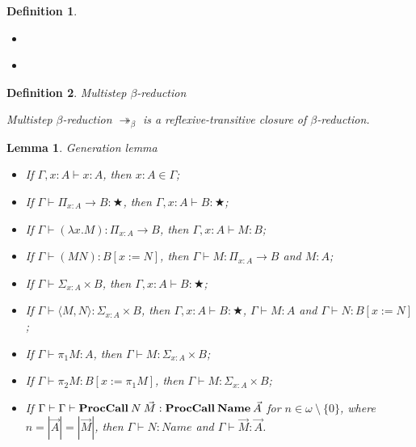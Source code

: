 \documentclass[a4paper]{article}
\newtheorem{defin}{Definition}
\newtheorem{lemma}{Lemma}
\begin{document}
\begin{defin}
\begin{itemize}
\begin{prooftree}
  \end{prooftree}
  \item
  \begin{prooftree}
  \end{prooftree}
  \item
  \begin{prooftree}
  \end{prooftree}
\end{itemize}
\end{defin}

\begin{defin} Multistep $\beta$-reduction

  Multistep $\beta$-reduction $\twoheadrightarrow_{\beta}$ is a reflexive-transitive closure of $\beta$-reduction.
\end{defin}

\begin{lemma} Generation lemma

  \begin{itemize}
    \item If $\Gamma, x : A \vdash x : A$, then $x : A \in \Gamma$;
    \item If $\Gamma \vdash \Pi_{x : A} \to B : \bigstar$, then $\Gamma, x : A \vdash B : \bigstar$;
    \item If $\Gamma \vdash (\lambda x. M) : \Pi_{x : A} \to B$, then $\Gamma, x : A \vdash M : B$;
    \item If $\Gamma \vdash (M N) : B [x := N]$, then $\Gamma \vdash M :  \Pi_{x : A} \to B$ and $M : A$;
    \item If $\Gamma \vdash \Sigma_{x : A} \times B$, then $\Gamma, x : A \vdash B : \bigstar$;
    \item If $\Gamma \vdash \langle M , N \rangle : \Sigma_{x : A} \times B$, then $\Gamma, x : A \vdash B : \bigstar$, $\Gamma \vdash M : A$ and $\Gamma \vdash N : B [x := N]$;
    \item If $\Gamma \vdash \pi_1 M : A $, then $\Gamma \vdash M : \Sigma_{x : A} \times B$;
    \item If $\Gamma \vdash \pi_2 M : B [x := \pi_1 M]$, then $\Gamma \vdash M : \Sigma_{x : A} \times B$;
    \item If $\Gamma \vdash \Gamma \vdash {\bf ProcCall} \: N \: \vec{M} : {\bf ProcCall} \: {\bf Name} \: \vec{A}$ for $n \in \omega \: \setminus \: \{ 0 \}$, where $n = |\vec{A}| = |\vec{M}|$,
    then $\Gamma \vdash N : Name$ and $\Gamma \vdash \vec{M} : \vec{A}$.
  \end{itemize}
\end{lemma}
\end{document}
